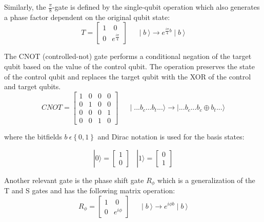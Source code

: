 \documentclass[reqno]{amsart}
\theoremstyle{definition}
\theoremstyle{remark}
\begin{document}
\noindent
Similarly, the $\frac{\pi}{8}$-gate is defined by the single-qubit operation 
which also generates a phase factor dependent on the original
qubit state:
\begin{equation}
T=
\begin{bmatrix}
 1 &\:0
 \\0 &e^{ \frac{i\pi}{4}} 
\end{bmatrix}
\:\:\:\:\:\:
\mid b\:\rangle\rightarrow e^{\frac{i\pi}{4}b}\mid b\:\rangle
\end{equation}

\noindent
The CNOT (controlled-not) gate performs a conditional negation of the target qubit 
based on the value of the control qubit. The operation preserves the state of the control
qubit and replaces the target qubit with the XOR of the control and target qubits.
\begin{equation}
CNOT=
\begin{bmatrix}
  1 &0 &0 &0
\\0 &1 &0 &0
\\0 &0 &0 &1
\\0 &0 &1 &0 
\end{bmatrix}
\:\:\:\:\:\:
\mid ...b_c...b_t...\rangle\rightarrow \mid ...b_c...b_c\oplus b_t...\rangle
\end{equation}

\noindent
where the bitfields $b\: \epsilon \left \{ 0,1 \right \} $ and Dirac notation is used for the basis states:

\begin{equation}
|0\rangle = \begin{bmatrix} 1 \\ 0 \end{bmatrix} \:\:\:\:  |1\rangle = \begin{bmatrix} 0 \\ 1 \end{bmatrix} 
\end{equation}

\noindent
Another relevant gate is the phase shift gate $R_{\phi}$ which is a generalization of the T and S gates and has the following matrix operation:
\begin{equation}
R_{\phi}=
\begin{bmatrix}
 1 &\:0
 \\0 &e^{i\phi}
\end{bmatrix}
\:\:\:\:\:\:
\mid b\:\rangle\rightarrow e^{i \phi b}\mid b\:\rangle
\end{equation}
\end{document}

